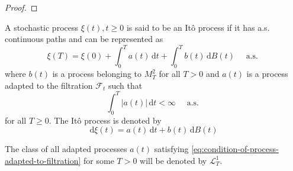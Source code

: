 \begin{proof}

\end{proof}

\begin{definition}
    A stochastic process $\xi(t),t\geq 0$ is said to be an Itô process if it has a.s. continuous paths and can be represented as
    \begin{equation}
        \xi(T)=\xi(0)+\int_{0}^{T}a(t)\,\mathrm{d}t+\int_{0}^{T}b(t)\,\mathrm{d}B(t)\quad\text { a.s. }
    \end{equation}
    where $b(t)$ is a process belonging to $M_{T}^{2}$ for all $T>0$ and $a(t)$ is a process adapted to the filtration $\mathcal{F}_{t}$ such that
    \begin{equation}
        \int_{0}^{T}|a(t)|\,\mathrm{d}t<\infty\quad\text { a.s. } \label{eq:condition-of-process-adapted-to-filtration}
    \end{equation}
    for all $T\geq 0$.
    The Itô process is denoted by
    \begin{equation}
        \mathrm{d}\xi(t)=a(t)\,\mathrm{d}t+b(t)\,\mathrm{d}B(t)
    \end{equation}
\end{definition}

\begin{remark}
    The class of all adapted processes $a(t)$ satisfying \ref{eq:condition-of-process-adapted-to-filtration} for some $T>0$ will be denoted by $\mathcal{L}_{T}^{1}$.
\end{remark}

